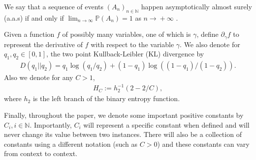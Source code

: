\documentclass[12pt,reqno]{amsart}
\numberwithin{equation}{section}
\theoremstyle{definition}
\renewcommand{\P}{\mathbb{P}}
\newcommand{\conv}[1]{\overset{#1}{\rightarrow}}
\renewcommand{\[}{\begin{equation}}
\renewcommand{\]}{\end{equation}}
\renewcommand{\|}{\bigg{|}}
\newcommand{\ngrow}{\ensuremath{n \conv{} +\infty} }
\begin{document}
     We say that a sequence of events $(A_n)_{n \in \mathbb{N}}$ happen asymptotically almost surely (a.a.s) if and only if $\lim_{n \conv{} \infty}\P(A_n) = 1$ as \ngrow.
     
    Given a function $f$ of possibly many variables, one of which is $\gamma$, define $\partial_\gamma f$ to represent the derivative of $f$ with respect to the variable $\gamma$. We also denote for $q_1,q_2 \in [0,1]$, the two point Kullback-Leibler (KL) divergence by
    \begin{align}\label{eq:two_KL}
    D(q_1||q_2) = q_1 \log(q_1/q_2) + (1-q_1)\log((1-q_1)/(1-q_2)).
    \end{align}
    Also we denote for any $C>1$,
    \begin{align}\label{def:H_C}
    H_C := h_2^{-1}(2-2/C),
    \end{align} where $h_2$ is the left branch of the binary entropy function.


Finally, throughout the paper, we denote some important positive constants by $C_i, i \in \mathbb{N}$. Importantly, $C_i$ will represent a specific constant when defined and will never change its value between two instances. There will also be a collection of constants using a different notation (such as $C>0$) and these constants can vary from context to context.



\end{document}
